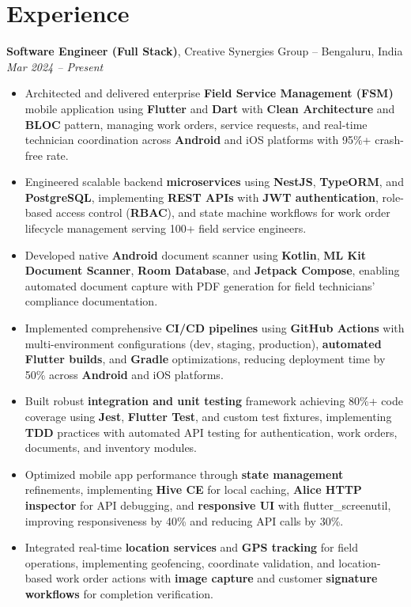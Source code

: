 \documentclass[10pt, letterpaper]{article}
\newenvironment{highlights}{
    \begin{itemize}[
        topsep=0.10 cm,
        parsep=0.10 cm,
        partopsep=0pt,
        itemsep=0.05cm, %
        leftmargin=10pt, %
        labelwidth=!, %
        labelsep=5pt %
    ]\justifying %
}{
    \end{itemize}
}
\newenvironment{onecolentry}{
    \begin{adjustwidth}{0cm}{0cm} %
    \RaggedRight %
}{
    \end{adjustwidth}
}
\begin{document}
    \section{Experience}

    \begin{onecolentry}
        \textbf{Software Engineer (Full Stack)}, Creative Synergies Group -- Bengaluru, India \hfill \textit{Mar 2024 – Present}
        \vspace{0.10 cm}
        \begin{highlights}
            \item Architected and delivered enterprise \textbf{Field Service Management (FSM)} mobile application using \textbf{Flutter} and \textbf{Dart} with \textbf{Clean Architecture} and \textbf{BLOC} pattern, managing work orders, service requests, and real-time technician coordination across \textbf{Android} and iOS platforms with 95\%+ crash-free rate.
            \item Engineered scalable backend \textbf{microservices} using \textbf{NestJS}, \textbf{TypeORM}, and \textbf{PostgreSQL}, implementing \textbf{REST APIs} with \textbf{JWT authentication}, role-based access control (\textbf{RBAC}), and state machine workflows for work order lifecycle management serving 100+ field service engineers.
            \item Developed native \textbf{Android} document scanner using \textbf{Kotlin}, \textbf{ML Kit Document Scanner}, \textbf{Room Database}, and \textbf{Jetpack Compose}, enabling automated document capture with PDF generation for field technicians' compliance documentation.
            \item Implemented comprehensive \textbf{CI/CD pipelines} using \textbf{GitHub Actions} with multi-environment configurations (dev, staging, production), \textbf{automated Flutter builds}, and \textbf{Gradle} optimizations, reducing deployment time by 50\% across \textbf{Android} and iOS platforms.
            \item Built robust \textbf{integration and unit testing} framework achieving 80\%+ code coverage using \textbf{Jest}, \textbf{Flutter Test}, and custom test fixtures, implementing \textbf{TDD} practices with automated API testing for authentication, work orders, documents, and inventory modules.
            \item Optimized mobile app performance through \textbf{state management} refinements, implementing \textbf{Hive CE} for local caching, \textbf{Alice HTTP inspector} for API debugging, and \textbf{responsive UI} with flutter\_screenutil, improving responsiveness by 40\% and reducing API calls by 30\%.
            \item Integrated real-time \textbf{location services} and \textbf{GPS tracking} for field operations, implementing geofencing, coordinate validation, and location-based work order actions with \textbf{image capture} and customer \textbf{signature workflows} for completion verification.
        \end{highlights}
    \end{onecolentry}
\end{document}
